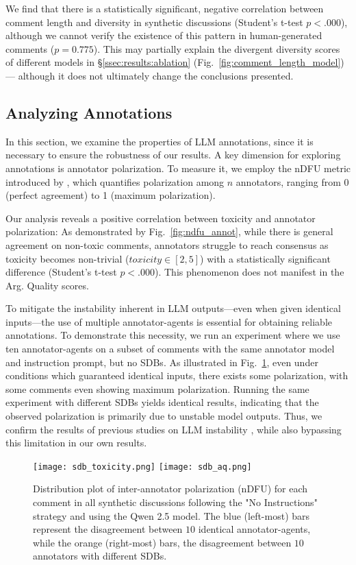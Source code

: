 We find that there is a statistically significant, negative correlation between comment length and diversity in synthetic discussions (Student's t-test  $p < .000$), although we cannot verify the existence of this pattern in human-generated comments ($p = 0.775$). This may partially explain the divergent diversity scores of different models in \S\ref{ssec:results:ablation}  (Fig.~\ref{fig:comment_length_model}) --- although it does not ultimately change the conclusions presented.


\subsection{Analyzing Annotations}

In this section, we examine the properties of LLM annotations, since it is necessary to ensure the robustness of our results. A key dimension for exploring annotations is annotator polarization. To measure it, we employ the nDFU metric introduced by \citet{pavlopoulos-likas-2024-polarized}, which quantifies polarization among $n$ annotators, ranging from 0 (perfect agreement) to 1 (maximum polarization).

Our analysis reveals a positive correlation between toxicity and annotator polarization: As demonstrated by Fig.~\ref{fig:ndfu_annot}, while there is general agreement on non-toxic comments, annotators struggle to reach consensus as toxicity becomes non-trivial ($\textit{toxicity} \in [2,5]$) with a statistically significant difference (Student's t-test $p < .000$). This phenomenon does not manifest in the Arg. Quality scores. 

To mitigate the instability inherent in LLM outputs—even when given identical inputs—the use of multiple annotator-agents is essential for obtaining reliable annotations. To demonstrate this necessity, we run an experiment where we use ten annotator-agents on a subset of comments with the same annotator model and instruction prompt, but no SDBs. As illustrated in Fig.~\ref{fig:sdb_annot}, even under conditions which guaranteed identical inputs, there exists some polarization, with some comments even showing maximum polarization. Running the same experiment with different SDBs yields identical results, indicating that the observed polarization is primarily due to unstable model outputs. Thus, we confirm the results of previous studies on LLM instability \cite{rossi_2024, atil_2025}, while also bypassing this limitation in our own results.


\begin{figure}[t]
	\texttt{[image: sdb\_toxicity.png]} \hfill
	\texttt{[image: sdb\_aq.png]}
	\centering
	\caption{Distribution plot of inter-annotator polarization (nDFU) for each comment in all synthetic discussions following the "No Instructions" strategy and using the Qwen 2.5 model. The blue (left-most) bars represent the disagreement between $10$ identical annotator-agents, while the orange (right-most) bars, the disagreement between $10$ annotators with different SDBs.}
	\label{fig:sdb_annot}
\end{figure}

